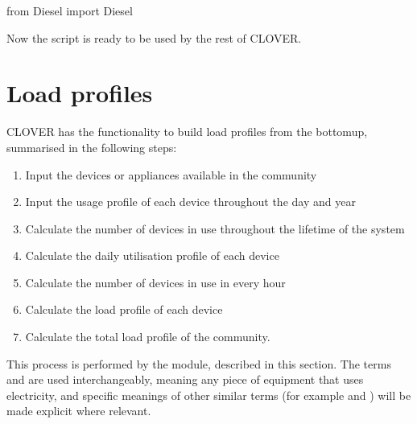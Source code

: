 \documentclass[letterpaper,10pt,english]{sphinxmanual}
\begin{document}
\begin{sphinxVerbatim}[commandchars=\\\{\}]
from Diesel import Diesel
\end{sphinxVerbatim}

\sphinxAtStartPar
Now the script is ready to be used by the rest of CLOVER.


\section{Load profiles}
\label{\detokenize{load:load-profiles}}\label{\detokenize{load::doc}}
\sphinxAtStartPar
CLOVER has the functionality to build load profiles from the bottom\sphinxhyphen{}up,
summarised in the following steps:
\begin{enumerate}
%
\item {} 
\sphinxAtStartPar
Input the devices or appliances available in the community

\item {} 
\sphinxAtStartPar
Input the usage profile of each device throughout the day and year

\item {} 
\sphinxAtStartPar
Calculate the number of devices in use throughout the lifetime of the system

\item {} 
\sphinxAtStartPar
Calculate the daily utilisation profile of each device

\item {} 
\sphinxAtStartPar
Calculate the number of devices in use in every hour

\item {} 
\sphinxAtStartPar
Calculate the load profile of each device

\item {} 
\sphinxAtStartPar
Calculate the total load profile of the community.

\end{enumerate}

\sphinxAtStartPar
This process is performed by the  module, described in this
section. The terms  and  are used interchangeably,
meaning any piece of equipment that uses electricity, and specific
meanings of other similar terms (for example  and )
will be made explicit where relevant.
\end{document}
